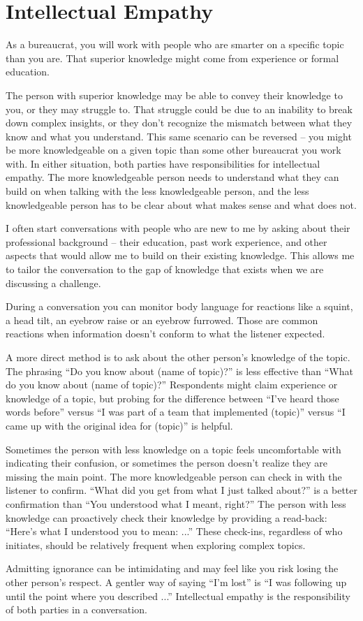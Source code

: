 \section{Intellectual Empathy\label{sec:intellectual-empathy}}

As a bureaucrat, you will work with people who are smarter on a specific topic than you are. That superior knowledge might come from experience or formal education. 

The person with superior knowledge may be able to convey their knowledge to you, or they may struggle to. That struggle could be due to an inability to break down complex insights, or they don't recognize the mismatch between what they know and what you understand. 
This same scenario can be reversed -- you might be more knowledgeable on a given topic than some other bureaucrat you work with. In either situation, both parties have responsibilities for \gls{intellectual empathy}. The more knowledgeable person needs to understand what they can build on when talking with the less knowledgeable person, and the less knowledgeable person has to be clear about what makes sense and what does not. 

I often start conversations with people who are new to me by asking about their professional background -- their education, past work experience, and other aspects that would allow me to build on their existing knowledge. This allows me to tailor the conversation to the gap of knowledge that exists when we are discussing a challenge. 

During a conversation you can monitor body language for reactions like a squint, a head tilt, an eyebrow raise or an eyebrow furrowed. Those are common reactions when information doesn't conform to what the listener expected. 

A more direct method is to ask about the other person's knowledge of the topic. The phrasing ``Do you know about (name of topic)?'' is less effective than ``What do you know about (name of topic)?'' Respondents might claim experience or knowledge of a topic, but probing for the difference between ``I've heard those words before'' versus ``I was part of a team that implemented (topic)'' versus ``I came up with the original idea for (topic)'' is helpful. 

Sometimes the person with less knowledge on a topic feels uncomfortable with indicating their confusion, or sometimes the person doesn't realize they are missing the main point. The more knowledgeable person can check in with the listener to confirm. ``What did you get from what I just talked about?'' is a better confirmation than ``You understood what I meant, right?'' The person with less knowledge can proactively check their knowledge by providing a read-back: ``Here's what I understood you to mean: ...'' These check-ins, regardless of who initiates, should be relatively frequent when exploring complex topics. 

Admitting ignorance can be intimidating and may feel like you risk losing the other person's respect. A gentler way of saying ``I'm lost'' is ``I was following up until the point where you described ...'' Intellectual empathy is the responsibility of both parties in a conversation. 